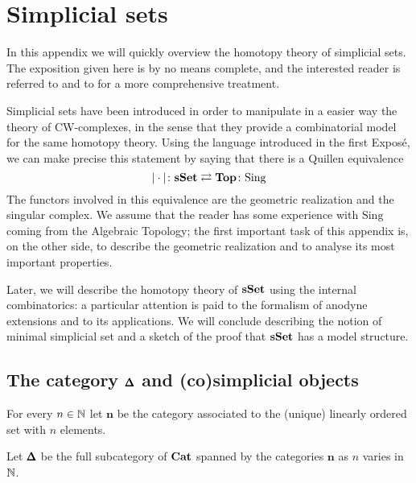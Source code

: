 \chapter{Simplicial sets}

\begin{refsection}

In this appendix we will quickly overview the homotopy theory of simplicial sets. The exposition given here is by no means complete, and the interested reader is referred to \cite{may} and to \cite[chapter 1]{goerss-jardine-simplicial-homotopy-theory} for a more comprehensive treatment.

Simplicial sets have been introduced in order to manipulate in a easier way the theory of CW-complexes, in the sense that they provide a combinatorial model for the same homotopy theory. Using the language introduced in the first Expos\'e, we can make precise this statement by saying that there is a Quillen equivalence
\[
|\cdot| \colon \mathbf{sSet} \rightleftarrows \mathbf{Top} \colon \mathrm{Sing}
\]
The functors involved in this equivalence are the geometric realization and the singular complex. We assume that the reader has some experience with $\mathrm{Sing}$ coming from the Algebraic Topology; the first important task of this appendix is, on the other side, to describe the geometric realization and to analyse its most important properties.

Later, we will describe the homotopy theory of $\mathbf{s\,\!\mathbf{Set}}$ using the internal combinatorics: a particular attention is paid to the formalism of anodyne extensions and to its applications. We will conclude describing the notion of minimal simplicial set and a sketch of the proof that $\mathbf{s\,\!\mathbf{Set}}$ has a model structure.

\section{The category \texorpdfstring{$\pmb{\Delta}$}{\textbackslash Delta} and (co)simplicial objects}

\begin{notation}
For every $n \in \mathbb{N}$ let $\mathbf n$ be the category associated to the (unique) linearly ordered set with $n$ elements.
\end{notation}

\begin{defin}
Let $\pmb{\Delta}$ be the full subcategory of $\mathbf{Cat}$ spanned by the categories $\mathbf n$ as $n$ varies in $\mathbb{N}$.
\end{defin}


\end{refsection}
